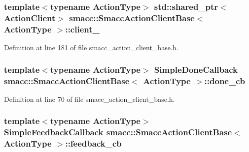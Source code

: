 \subsubsection[{\texorpdfstring{client\+\_\+}{client_}}]{\setlength{\rightskip}{0pt plus 5cm}template$<$typename Action\+Type$>$ std\+::shared\+\_\+ptr$<${\bf Action\+Client}$>$ {\bf smacc\+::\+Smacc\+Action\+Client\+Base}$<$ Action\+Type $>$\+::client\+\_\+\hspace{0.3cm}{\ttfamily [protected]}}\hypertarget{classsmacc_1_1SmaccActionClientBase_a10d3b707b855c6d360aeeb35e50cd0c7}{}\label{classsmacc_1_1SmaccActionClientBase_a10d3b707b855c6d360aeeb35e50cd0c7}


Definition at line 181 of file smacc\+\_\+action\+\_\+client\+\_\+base.\+h.

\subsubsection[{\texorpdfstring{done\+\_\+cb}{done_cb}}]{\setlength{\rightskip}{0pt plus 5cm}template$<$typename Action\+Type$>$ {\bf Simple\+Done\+Callback} {\bf smacc\+::\+Smacc\+Action\+Client\+Base}$<$ Action\+Type $>$\+::done\+\_\+cb}\hypertarget{classsmacc_1_1SmaccActionClientBase_aea7036326fe0f2bb9355c71e80e36516}{}\label{classsmacc_1_1SmaccActionClientBase_aea7036326fe0f2bb9355c71e80e36516}


Definition at line 70 of file smacc\+\_\+action\+\_\+client\+\_\+base.\+h.

\subsubsection[{\texorpdfstring{feedback\+\_\+cb}{feedback_cb}}]{\setlength{\rightskip}{0pt plus 5cm}template$<$typename Action\+Type$>$ {\bf Simple\+Feedback\+Callback} {\bf smacc\+::\+Smacc\+Action\+Client\+Base}$<$ Action\+Type $>$\+::feedback\+\_\+cb}\hypertarget{classsmacc_1_1SmaccActionClientBase_a64651f1579824551fb7a3b4862d4373d}{}\label{classsmacc_1_1SmaccActionClientBase_a64651f1579824551fb7a3b4862d4373d}


